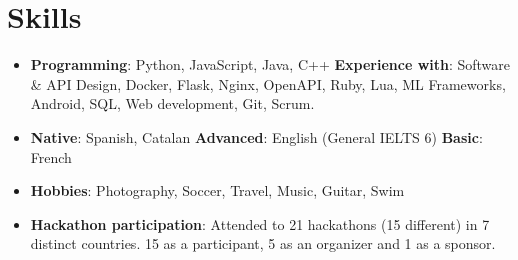 \documentclass[letterpaper,11pt]{article}
\newcommand{\resumeSubHeadingListStart}{\begin{itemize}[leftmargin=*]}
\newcommand{\resumeSubHeadingListEnd}{\end{itemize}}
\begin{document}
\section{Skills}
  \resumeSubHeadingListStart
    \item{
      \textbf{Programming}{: Python, JavaScript, Java, C++}
      \textbf{Experience with}{: Software \& API Design, Docker, Flask, Nginx, OpenAPI, Ruby, Lua, ML Frameworks, Android, SQL, Web development, Git, Scrum.}
    }
    \item{
      \textbf{Native}{: Spanish, Catalan}
      \textbf{Advanced}{: English (General IELTS 6)}
      \textbf{Basic}{: French}
    }
    \item{
      \textbf{Hobbies}{: Photography, Soccer, Travel, Music, Guitar, Swim}
    }
    \item{
      \textbf{Hackathon participation}{: Attended to 21 hackathons (15 different) in 7 distinct countries. 15 as a participant, 5 as an organizer and 1 as a sponsor.}
    }
  \resumeSubHeadingListEnd


\end{document}

